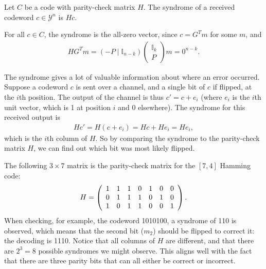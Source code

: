\begin{definition}[Syndrome]
Let $C$ be a code with parity-check matrix $H$. The syndrome of a received codeword $c \in \mathcal{Y}^n$ is $Hc$.
\end{definition}
For all $c \in C$, the syndrome is the all-zero vector, since $c = G^Tm$ for some $m$, and 
\begin{align}
HG^Tm = \left(-P\mid \mathbb{I}_{n-k}\right)\left(\begin{array}{c} \mathbb{I}_{k} \\\hline P \end{array}\right) m = 0^{n-k}.
\end{align}

The syndrome gives a lot of valuable information about where an error occurred. Suppose a codeword $c$ is sent over a channel, and a single bit of $c$ if flipped, at the $i$th position. The output of the channel is thus $c' = c + e_i$ (where $e_i$ is the $i$th unit vector, which is 1 at position $i$ and 0 elsewhere). The syndrome for this received output is
\begin{align}
Hc' = H(c + e_i) = Hc + He_i = He_i,
\end{align}
which is the $i$th column of $H$. So by comparing the syndrome to the parity-check matrix $H$, we can find out which bit was most likely flipped.

\begin{example}
The following $3 \times 7$ matrix is the parity-check matrix for the $[7,4]$ Hamming code:
\[
H = \left(\begin{array}{c c c c c c c}
1 & 1 & 1 & 0 & 1 & 0 & 0\\
0 & 1 & 1 & 1 & 0 & 1 & 0\\
1 & 0 & 1 & 1 & 0 & 0 & 1\\
\end{array}
\right).
\]
When checking, for example, the codeword 1010100, a syndrome of 110 is observed, which means that the second bit ($m_2$) should be flipped to correct it: the decoding is 1110.
Notice that all columns of $H$ are different, and that there are $2^3 = 8$ possible syndromes we might observe. This aligns well with the fact that there are three parity bits that can all either be correct or incorrect.
\end{example}

